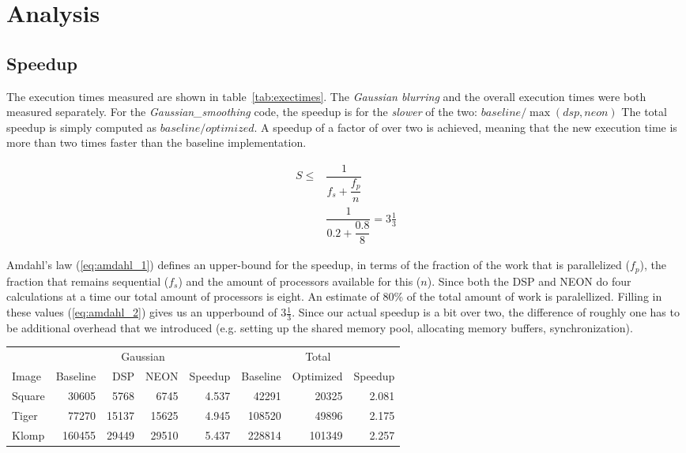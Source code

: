 \section{Analysis}
\label{sec:analysis}
\subsection{Speedup}
The execution times measured are shown in table~\ref{tab:exectimes}. The \emph{Gaussian blurring} and the overall execution times were both measured separately. For the \emph{Gaussian\_smoothing} code, the speedup is for the \emph{slower} of the two:
${baseline}/{\max(dsp,neon)}$ 
The total speedup is simply computed as 
${baseline}/{optimized}$.
A speedup of a factor of over two is achieved, meaning that the new execution time is more than two times faster than the baseline implementation.

\begin{subequations}
\begin{align}
    S \leq & \dfrac{1}{f_{s} + \dfrac{f_{p}}{n}}                    \label{eq:amdahl_1} \\
           & \dfrac{1}{0.2   + \dfrac{0.8}  {8}} = 3 \frac{1}{3}    \label{eq:amdahl_2}
\end{align}
\end{subequations}

Amdahl's law (\ref{eq:amdahl_1}) defines an upper-bound for the speedup, in terms of the fraction of the work that is parallelized ($f_{p}$), the fraction that remains sequential ($f_{s}$) and the amount of processors available for this ($n$). Since both the DSP and NEON do four calculations at a time our total amount of processors is eight. An estimate of 80\% of the total amount of work is paralellized. Filling in these values (\ref{eq:amdahl_2}) gives us an upperbound of $3 \frac{1}{3}$. Since our actual speedup is a bit over two, the difference of roughly one has to be additional overhead that we introduced (e.g. setting up the shared memory pool, allocating memory buffers, synchronization).

\begin{table*}
\centering
\begin{tabular}{l | r r r r | r r r}
        & \multicolumn{4}{|c|}{Gaussian}                & \multicolumn{3}{|c}{Total}                \\
Image   & Baseline  & DSP   & NEON          & Speedup   & Baseline  & Optimized         & Speedup   \\
\hline
Square  & 30605     & 5768  & 6745          & 4.537     & 42291     & 20325             & 2.081     \\
Tiger   & 77270     & 15137 & 15625         & 4.945     & 108520    & 49896             & 2.175     \\
Klomp   & 160455    & 29449 & 29510         & 5.437     & 228814    & 101349            & 2.257     \\
\end{tabular}
\caption{The execution times measured in $\mu$s}
\label{tab:exectimes}
\end{table*}

